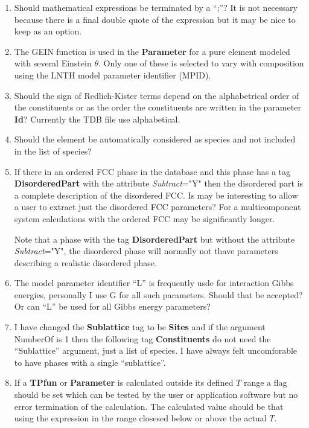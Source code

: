 \documentclass{article}
\begin{document}
\begin{enumerate}
\item Should mathematical expressions be terminated by a ``;''?  It is
  not necessary because there is a final double quote of the
  expression but it may be nice to keep as an option.

\item The GEIN function is used in the {\bf Parameter} for a pure
  element modeled with several Einstein $\theta$.  Only one of these
  is selected to vary with composition using the LNTH model parameter
  identifier (MPID).

\item Should the sign of Redlich-Kister terms depend on the
  alphabetrical order of the constituents or as the order the
  constituents are written in the parameter {\bf Id}?  Currently the
  TDB file use alphabetical.

\item Should the element be automatically considered as species and
  not included in the list of species?

\item If there in an ordered FCC phase in the database
  and this phase has a tag {\bf DisorderedPart} with the attribute
  {\em Subtract}="Y" then the disordered part is a complete
  description of the disordered FCC.  Is may be interesting to allow a
  user to extract just the disordered FCC parameters?  For a
  multicomponent system calculations with the ordered FCC may be
  significantly longer.

  Note that a phase with the tag {\bf DisorderedPart} but without the
  attribute {\em Subtract}="Y", the disordered phase will normally not
  thave parameters describing a realistic disordered phase.

\item The model parameter identifier ``L'' is frequently usde for
  interaction Gibbs energies, personally I use G for all such
  parameters.  Should that be accepted?  Or can ``L'' be used for all
  Gibbs energy parameters?

\item I have changed the {\bf Sublattice} tag to be {\bf Sites} and if
  the argument NumberOf is 1 then the following tag {\bf Constituents}
  do not need the ``Sublattice'' argument, just a list of species.  I
  have always felt uncomforable to have phases with a single
  ``sublattice''.

\item If a {\bf TPfun} or {\bf Parameter} is calculated outside its
  defined $T$ range a flag should be set which can be tested by the
  user or application software but no error termination of the
  calculation.  The calculated value should be that using the
  expression in the range closesed below or above the actual $T$.

\end{enumerate}
\end{document}
